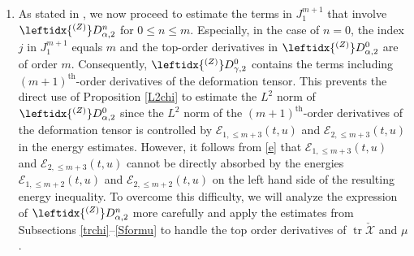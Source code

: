 \documentclass[11pt,twoside]{article}
\def\al{\alpha}
\def \no{\nonumber}
\begin{document}
\begin{enumerate}
\begin{align}
+\leftidx{^{(Z_{m+2-p})}}\lambda\big)\leftidx{^{(Z_{m+1-p})}}D_{\al,3}^{m-p}\cdot\mathring{\underline L}Z^{m+1}\varphi_\al\big|\notag\\
\lesssim&\delta^{3\nu-2}(1+\delta^{4\nu-6})+\frac{\delta^{\nu-1}}{b_{m+2}}
\mu_{\min}^{-2b_{m+2}}(t)
\bigl(\delta^{2\nu-2}\mu_{\min}(t)
{\widetilde{\mathcal{E}}_{1,\leq m+2}(t,u)}
+{\widetilde{\mathcal{E}}_{2,\leq m+2}(t,u)}
\bigr).\label{D33}
\end{align}
The terms in $\delta^{2l+2s(2-\nu)}\int_{D^{t, u}}|\Phi\cdot \mathring L\Psi|$
related to the integrand factors $\leftidx{^{(Z)}}D_{\al,i}^{n}$ $(i=1,3)$ can also be estimated as follows
\begin{align}\label{D13}
&\delta^{2l+2k(2-\nu)}\int_{D^{t, u}}\big|\sum_{p=1}^{m}\big(Z_{m+1}+\leftidx{^{(Z_{m+1})}}\lambda\big)\dots\big(Z_{m+2-p}
+\leftidx{^{(Z_{m+2-p})}}\lambda\big)\big(\leftidx{^{(Z_{m+1-p})}}D_{\al,1}^{m-p}\no\\
&\qquad\qquad\qquad+\leftidx{^{(Z_{m+1-p})}}D_{\al,3}^{m-p}\big)\mathring L\varphi_\al^{m+1}\big|\no\\
\lesssim&\delta^{2l+2k(2-\nu)+1}\int_{D^{t, u}}\Big\{\sum_{p=1}^{m}\big(Z_{m+1}+\leftidx{^{(Z_{m+1})}}\lambda\big)\dots\big(Z_{m+2-p}
+\leftidx{^{(Z_{m+2-p})}}\lambda\big)\big(\leftidx{^{(Z_{m+1-p})}}D_{\al,1}^{m-p}\no\\
&\qquad+\leftidx{^{(Z_{m+1-p})}}D_{\al,3}^{m-p}\big)\Big\}^2+\delta^{2l+2s(2-\nu)-1}\int_{D^{t, u}}|\mathring LZ^{m+1}\varphi_\al|^2\no\\
\lesssim&\delta^{5\nu-6}+\frac{\delta^{\nu-1}}{b_{m+2}}
\mu_{\min}^{-2b_{m+2}}(t)
\bigl(
{\widetilde{\mathcal{E}}_{1,\leq m+2}(t,u)}
+\delta^{2\nu-2}\mu_{\min}(t){\widetilde{\mathcal{E}}_{2,\leq m+2}(t,u)}
\bigr)\\
&+\delta^{-1}\int_0^uF_{1,m+2}(s,u')du'.\no
\end{align}

\item As stated in \cite[Section 5]{Ding4}, we now proceed to estimate the terms in $J_1^{m+1}$ that involve $\leftidx{^{(Z)}}D_{\al,2}^{n}$ for
$0 \leq n \leq m$. Especially, in the case of $n=0$, the index $j$ in $J_1^{m+1}$ equals $m$ and the top-order derivatives in $\leftidx{^{(Z)}}D_{\al,2}^{0}$ are of order $m$. Consequently, $\leftidx{^{(Z)}}D_{\gamma,2}^{0}$ contains the terms including $(m+1)^\text{th}$-order derivatives of the deformation tensor.
This prevents the direct use of Proposition \ref{L2chi} to estimate the $L^2$ norm of $\leftidx{^{(Z)}}D_{\al,2}^0$
since the $L^2$ norm of the $(m+1)^\text{th}$-order derivatives of the deformation tensor is controlled by $\mathcal{E}_{1,\leq m+3}(t,u)$ and $\mathcal{E}_{2,\leq m+3}(t,u)$ in the energy estimates. However, it follows from \eqref{e} that $\mathcal{E}_{1,\leq m+3}(t,u)$ and $\mathcal{E}_{2,\leq m+3}(t,u)$ cannot be directly absorbed by the energies $\mathcal{E}_{1,\leq m+2}(t,u)$ and $\mathcal{E}_{2,\leq m+2}(t,u)$ on the left hand side of the resulting energy inequality. To overcome this difficulty, we will analyze the expression of $\leftidx{^{(Z)}}D_{\al,2}^n$ more carefully and apply the estimates from Subsections \ref{trchi}--\ref{Sformu} to handle the top order derivatives of $\operatorname{tr}{\check{\mathscr X}}$ and $\mu$.


\end{enumerate}
\end{document}
